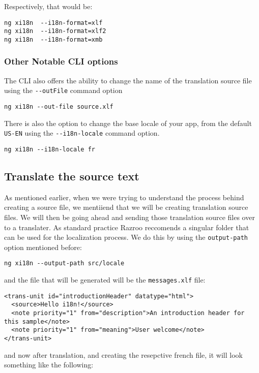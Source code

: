 Respectively, that would be: 
\begin{verbatim}
ng xi18n  --i18n-format=xlf
ng xi18n  --i18n-format=xlf2
ng xi18n  --i18n-format=xmb  
\end{verbatim}

\subsubsection{Other Notable CLI options}
The CLI also offers the ability to change the name of the translation source 
file using the \lstinline{--outFile} command option
\begin{verbatim}
ng xi18n --out-file source.xlf  
\end{verbatim}

There is also the option to change the base locale of your app, from the 
default \lstinline{US-EN} using the \lstinline{--i18n-locale} command option.
\begin{verbatim}
ng xi18n --i18n-locale fr
\end{verbatim}

\subsection{Translate the source text}
As mentioned earlier, when we were trying to understand the process behind 
creating a source file, we mentiiend that we will be creating translation 
source files. We will then be going ahead and sending those translation 
source files over to a translater. As standard practice Razroo reccomends
a singular folder that can be used for the localization process. We do this 
by using the \lstinline{output-path} option mentioned before:
\begin{verbatim}
ng xi18n --output-path src/locale  
\end{verbatim}

and the file that will be generated will be the \lstinline{messages.xlf} file:

\begin{lstlisting}[caption=src/locale/messages.xlf]
<trans-unit id="introductionHeader" datatype="html">
  <source>Hello i18n!</source>
  <note priority="1" from="description">An introduction header for this sample</note>
  <note priority="1" from="meaning">User welcome</note>
</trans-unit>
\end{lstlisting}

and now after translation, and creating the resepctive french file, it will 
look something like the following: 

